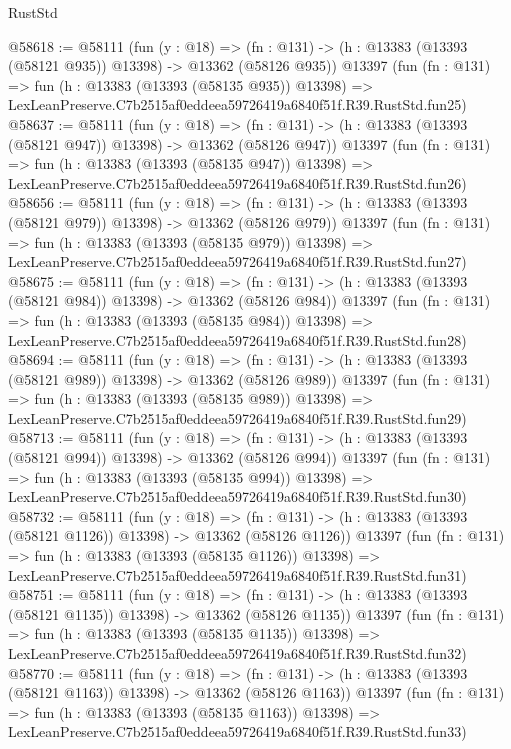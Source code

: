 \begin{lexlean}{RustStd}
\begin{coremodule}
@58618 := @58111
    (fun (y : @18) =>
    (fn : @131) -> (h : @13383 (@13393 (@58121 @935)) @13398) -> @13362 (@58126 @935))
    @13397
    (fun (fn : @131) =>
    fun (h : @13383 (@13393 (@58135 @935)) @13398) =>
    LexLeanPreserve.C7b2515af0eddeea59726419a6840f51f.R39.RustStd.fun25)
@58637 := @58111
    (fun (y : @18) =>
    (fn : @131) -> (h : @13383 (@13393 (@58121 @947)) @13398) -> @13362 (@58126 @947))
    @13397
    (fun (fn : @131) =>
    fun (h : @13383 (@13393 (@58135 @947)) @13398) =>
    LexLeanPreserve.C7b2515af0eddeea59726419a6840f51f.R39.RustStd.fun26)
@58656 := @58111
    (fun (y : @18) =>
    (fn : @131) -> (h : @13383 (@13393 (@58121 @979)) @13398) -> @13362 (@58126 @979))
    @13397
    (fun (fn : @131) =>
    fun (h : @13383 (@13393 (@58135 @979)) @13398) =>
    LexLeanPreserve.C7b2515af0eddeea59726419a6840f51f.R39.RustStd.fun27)
@58675 := @58111
    (fun (y : @18) =>
    (fn : @131) -> (h : @13383 (@13393 (@58121 @984)) @13398) -> @13362 (@58126 @984))
    @13397
    (fun (fn : @131) =>
    fun (h : @13383 (@13393 (@58135 @984)) @13398) =>
    LexLeanPreserve.C7b2515af0eddeea59726419a6840f51f.R39.RustStd.fun28)
@58694 := @58111
    (fun (y : @18) =>
    (fn : @131) -> (h : @13383 (@13393 (@58121 @989)) @13398) -> @13362 (@58126 @989))
    @13397
    (fun (fn : @131) =>
    fun (h : @13383 (@13393 (@58135 @989)) @13398) =>
    LexLeanPreserve.C7b2515af0eddeea59726419a6840f51f.R39.RustStd.fun29)
@58713 := @58111
    (fun (y : @18) =>
    (fn : @131) -> (h : @13383 (@13393 (@58121 @994)) @13398) -> @13362 (@58126 @994))
    @13397
    (fun (fn : @131) =>
    fun (h : @13383 (@13393 (@58135 @994)) @13398) =>
    LexLeanPreserve.C7b2515af0eddeea59726419a6840f51f.R39.RustStd.fun30)
@58732 := @58111
    (fun (y : @18) =>
    (fn : @131) -> (h : @13383 (@13393 (@58121 @1126)) @13398) -> @13362 (@58126 @1126))
    @13397
    (fun (fn : @131) =>
    fun (h : @13383 (@13393 (@58135 @1126)) @13398) =>
    LexLeanPreserve.C7b2515af0eddeea59726419a6840f51f.R39.RustStd.fun31)
@58751 := @58111
    (fun (y : @18) =>
    (fn : @131) -> (h : @13383 (@13393 (@58121 @1135)) @13398) -> @13362 (@58126 @1135))
    @13397
    (fun (fn : @131) =>
    fun (h : @13383 (@13393 (@58135 @1135)) @13398) =>
    LexLeanPreserve.C7b2515af0eddeea59726419a6840f51f.R39.RustStd.fun32)
@58770 := @58111
    (fun (y : @18) =>
    (fn : @131) -> (h : @13383 (@13393 (@58121 @1163)) @13398) -> @13362 (@58126 @1163))
    @13397
    (fun (fn : @131) =>
    fun (h : @13383 (@13393 (@58135 @1163)) @13398) =>
    LexLeanPreserve.C7b2515af0eddeea59726419a6840f51f.R39.RustStd.fun33)

\end{coremodule}
\end{lexlean}
